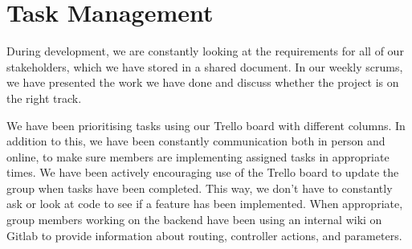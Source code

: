 \documentclass[a4paper]{article}
\begin{document}
\section{Task Management}



During development, we are constantly looking at the requirements for 
all of our stakeholders, which 
we have stored in a shared document. In our weekly scrums, we have 
presented the work we have done and discuss whether the project is on the 
right track.



We have been prioritising tasks using our Trello board with different
columns. In addition to this, we have been constantly communication both 
in person and online, to make sure members are implementing assigned tasks
in appropriate times. We have been actively encouraging use of the Trello 
board to update the group when tasks have been completed. This way, 
we don't have to constantly ask or look at code to see if a feature has 
been implemented. When appropriate, group members working on the backend
have been using an internal wiki on Gitlab to provide information about
routing, controller actions, and parameters. 
\end{document}
